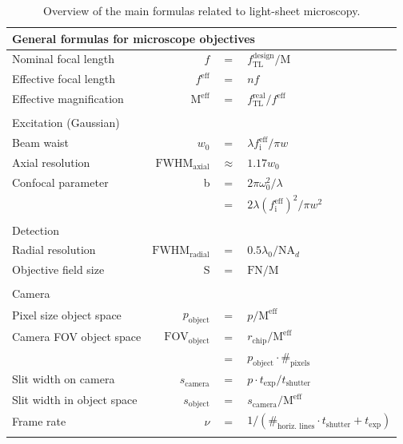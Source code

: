\documentclass[12pt]{spieman}  %
\begin{document}
\begin{spacing}{2}
\begin{table}[t!]
	\centering
		\caption[Main formulas]{Overview of the main formulas related to light-sheet microscopy. \label{tab:resolution}}
		\begin{tabular}{lrcl}
		\\
		\multicolumn{4}{l}{General formulas for microscope objectives}\\\hline\hline 
		Nominal focal length							& $f$ 													& $=$					& $f_{\text{TL}}^{\text{design}}/\text{M}$				\\	
		Effective focal length						& $f^{\text{eff}}$							& $=$					& $nf$													\\
		Effective magnification						& $\text{M}^{\text{eff}}$				& $=$					& $f_{\text{TL}}^{\text{real}}/f^{\text{eff}}$			\\\\
		\multicolumn{4}{l}{Excitation (Gaussian)}\\\hline\hline	
		Beam waist												&$w_0$													& $=$ 				& $ \lambda f_{\text{i}}^{\text{eff}} / \pi w$				\\
		Axial resolution									&$\text{FWHM}_{\text{axial}}$		& $\approx$   & $ 1.17 w_0 $											\\
		Confocal parameter								& b															& $=$  				& $2 \pi \omega_0^2 / \lambda$							\\
																			&  															& $=$   			& $2 \lambda {(f_{\text{i}}^{\text{eff}})}^2 / \pi w^2 $	\\\\
		\multicolumn{4}{l}{Detection}\\\hline\hline  
		Radial resolution									&$\text{FWHM}_{\text{radial}}$	& $=$					& $0.5 \lambda_0 / \text{NA}_{d}$						\\
		Objective field size							& S															& $=$					& $\text{FN}/{\text{M}}$								\\\\
		\multicolumn{4}{l}{Camera}\\\hline\hline  
		Pixel size object space						& $ p_{\text{object}}$					& $=$					& $p/  \text{M}^{\text{eff}}$							\\
		Camera FOV object space						&$\text{FOV}_{\text{object}}$		& $=$					& $r_{\text{chip}} / \text{M}^{\text{eff}}$				\\
																			&																& $=$					& $p_{\text{object}} \cdot \#_{\text{pixels}}$			\\
		Slit width on camera							& $s_{\text{camera}}$						& $=$					& $ p \cdot t_{\text{exp}} / t_{\text{shutter}} $			\\
		Slit width in object space				& $s_{\text{object}}$						& $=$					& $ s_{\text{camera}}/ \text{M}^{\text{eff}}$			\\
		Frame rate												& $\nu$													& $=$					& $1/(\#_{\text{horiz. lines}} \cdot t_{\text{shutter}} + t_{\text{exp}})$ \\\\

		\end{tabular}
\end{table}


\listoffigures
\end{spacing}
\end{document}
